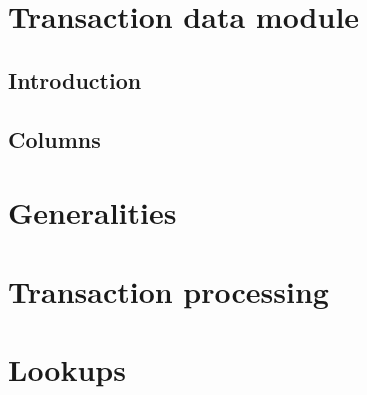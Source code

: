 
\section{Transaction data module}                                                   \label{user txn data: generalities}
\subsection{Introduction}                                                           \label{user txn data: intro}                                       
\subsection{Columns}                                                                \label{user txn data: columns}                                     

\section{Generalities}                                                              \label{user txn data: generalities}                                
\section{Transaction processing}                                                    \label{user txn data: processing}                                  
\section{Lookups}                                                                   \label{user txn data: lookups}                                     
